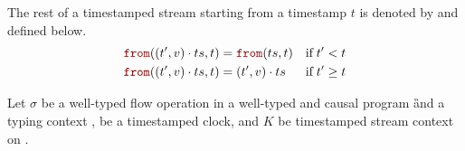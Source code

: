 \begin{definition}
    \label{def:semantics:grfrp:theorems:equivalence:from}
    The rest of a timestamped stream \ts starting from a timestamp $t$ is denoted by  and
    defined below.
    \begin{align}
        \from{(t', v) \next \ts}{t} & = \from{\ts}{t}     & \text{if} \; t' & < t   \\
        \from{(t', v) \next \ts}{t} & = (t', v) \next \ts & \text{if} \; t' & \ge t
    \end{align}
\end{definition}

\begin{lemma}
    \label{lem:semantics:grfrp:theorems:equivalence:flowop}
    Let $\sigma$ be a well-typed flow operation in a well-typed and causal program \G and a
    typing context \tyCtx, \tck be a timestamped clock, and $K$ be timestamped stream context on
    \tck.


\end{lemma}
